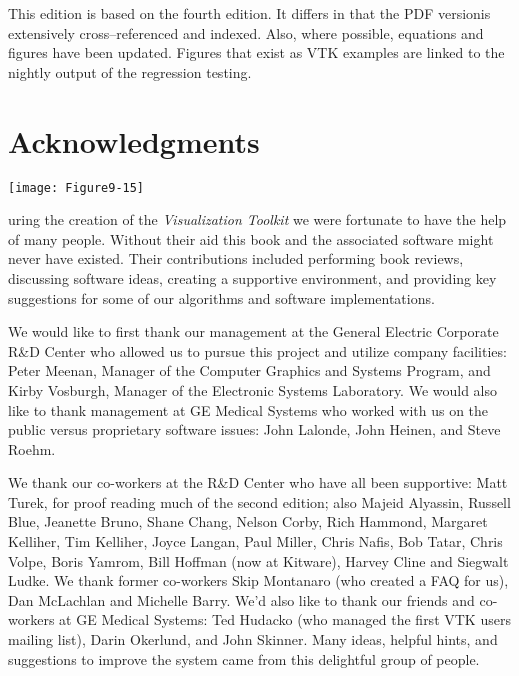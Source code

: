 This edition is based on the fourth edition. It differs in that the PDF versionis extensively cross--referenced and indexed. Also, where possible, equations and figures have been updated. Figures that exist as VTK examples are linked to the nightly output of the regression testing.

\chapter*{Acknowledgments}
\markright{}

\vspace{-7\baselineskip} %
\hfill
 \begin{minipage}{0.5\textwidth}
 \centering
 \texttt{[image: Figure9-15]}
 \end{minipage}
\vspace{2\baselineskip}



uring the creation of the \textit{Visualization Toolkit} we were fortunate to have the help of many people. Without their aid this book and the associated software might never have existed. Their contributions included performing book reviews, discussing software ideas, creating a supportive environment, and providing key suggestions for some of our algorithms and software implementations.

We would like to first thank our management at the General Electric Corporate R\&D Center who allowed us to pursue this project and utilize company facilities: Peter Meenan, Manager of the Computer Graphics and Systems Program, and Kirby Vosburgh, Manager of the Electronic Systems Laboratory. We would also like to thank management at GE Medical Systems who worked with us on the public versus proprietary software issues: John Lalonde, John Heinen, and Steve Roehm.

We thank our co-workers at the R\&D Center who have all been supportive: Matt Turek, for proof reading much of the second edition; also Majeid Alyassin, Russell Blue, Jeanette Bruno, Shane Chang, Nelson Corby, Rich Hammond, Margaret Kelliher, Tim Kelliher, Joyce Langan, Paul Miller, Chris Nafis, Bob Tatar, Chris Volpe, Boris Yamrom, Bill Hoffman (now at Kitware), Harvey Cline and Siegwalt Ludke. We thank former co-workers Skip Montanaro (who created a FAQ for us), Dan McLachlan and Michelle Barry. We'd also like to thank our friends and co-workers at GE Medical Systems: Ted Hudacko (who managed the first VTK users mailing list), Darin Okerlund, and John Skinner. Many ideas, helpful hints, and suggestions to improve the system came from this delightful group of people.

